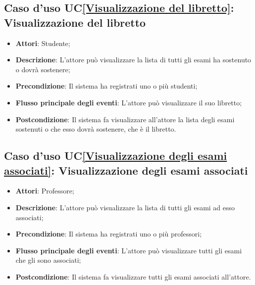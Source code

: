 \subsection{Caso d'uso UC\ref{Visualizzazione del libretto}: Visualizzazione del libretto}
\begin{itemize}
	\item \textbf{Attori}: Studente;
	\item \textbf{Descrizione}: L'attore può visualizzare la lista di tutti gli esami ha sostenuto o dovrà sostenere;
	\item \textbf{Precondizione}: Il sistema ha registrati uno o più studenti;
	\item \textbf{Flusso principale degli eventi}: L'attore può visualizzare il suo libretto;
	\item \textbf{Postcondizione}: Il sistema fa visualizzare all'attore la lista degli esami sostenuti o che esso dovrà sostenere, che è il libretto.
\end{itemize}

\subsection{Caso d'uso UC\ref{Visualizzazione degli esami associati}: Visualizzazione degli esami associati}
\begin{itemize}
	\item \textbf{Attori}: Professore;
	\item \textbf{Descrizione}: L'attore può visualizzare la lista di tutti gli esami ad esso associati;
	\item \textbf{Precondizione}: Il sistema ha registrati uno o più professori;
	\item \textbf{Flusso principale degli eventi}: L'attore può visualizzare tutti gli esami che gli sono associati;
	\item \textbf{Postcondizione}: Il sistema fa visualizzare tutti gli esami associati all'attore.
\end{itemize}

